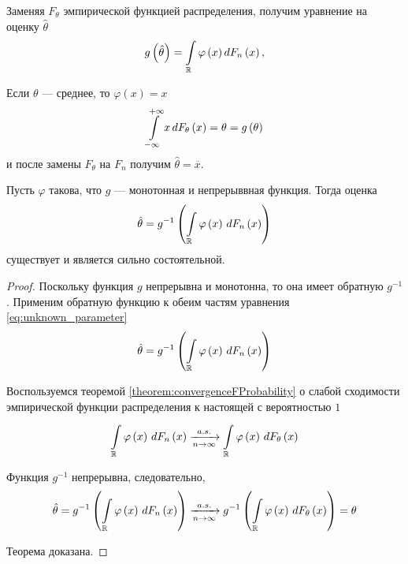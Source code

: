 Заменяя $F_{\theta}$ эмпирической функцией распределения, получим уравнение
на оценку $\hat{\theta}$
\begin{equation}\label{eq:unknown_parameter}
  g\left(\hat{\theta}\right)
    = \int\limits_{\mathbb{R}}\varphi\left(x\right)d\cdfn{x},
\end{equation}

\begin{example}
  Если $\theta$ --- среднее, то $\varphi\left(x\right)=x$
  \begin{equation*}
    \integral{-\infty}{+ \infty}{\cdfof{\theta}{x}}{x}
    = \theta
    = g\left(\theta\right)
  \end{equation*}
  и после замены $F_\theta$ на $F_n$ получим $\hat{\theta} = \overline{x}$.
\end{example}
\begin{theorem}
  Пусть $\varphi$ такова, что $g$ --- монотонная и непрерыввная функция.
  Тогда оценка
  \begin{equation*}
    \hat{\theta}
    = g^{-1}\left( \integrall{\mathbb{R}}{d\cdfn{x}}{
      \varphi\left( x \right)} \right)
  \end{equation*}
  существует и является сильно состоятельной.
\end{theorem}
\begin{proof}
  Поскольку функция $g$ непрерывна и монотонна,
  то она имеет обратную $g^{-1}$.
  Применим обратную функцию к обеим частям уравнения
  \eqref{eq:unknown_parameter}
  \begin{equation*}
    \hat{\theta}
    = g^{-1}\left( \integrall{\mathbb{R}}{d\cdfn{x}}{\varphi\left( x \right)}
        \right)
  \end{equation*}

  Воспользуемся теоремой \ref{theorem:convergenceFProbability} о слабой
  сходимости эмпирической функции распределения к настоящей с вероятностью $1$
  \begin{equation*}
    \integrall{\mathbb{R}}{d\cdfn{x}}{\varphi\left( x \right)}
    \acovergence \integrall{\mathbb{R}}{d\cdfof{\theta}{x}}{
        \varphi\left( x \right)}
  \end{equation*}

  Функция $g^{-1}$ непрерывна, следовательно,
  \begin{equation*}
  \hat{\theta}
  = g^{-1}\left( \integrall{\mathbb{R}}{
    d\cdfn{x}}{\varphi\left( x \right)} \right)
  \acovergence
    g^{-1}\left( \integrall{\mathbb{R}}{
      d\cdfof{\theta}{x}}{\varphi\left( x \right)} \right)
  = \theta
  \end{equation*}

  Теорема доказана.
\end{proof}

